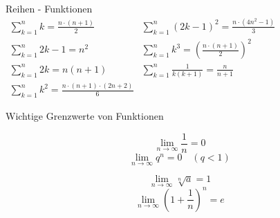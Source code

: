 \begin{corollary}{Reihen - Funktionen}\\
    $
    \begin{array}{ll}
        \sum^{n}_{k=1} k = \frac{n \cdot (n+1)}{2} & \sum^{n}_{k=1} (2k - 1)^2 = \frac{n \cdot (4n^2-1)}{3}\\
    	\sum^{n}_{k=1} 2k-1 = n^2 & \sum^{n}_{k=1} k^3 = \left( \frac{n \cdot (n+1)}{2}\right)^2\\
    	\sum^{n}_{k=1} 2k = n(n+1) & \sum^{n}_{k=1} \frac{1}{k(k+1)} = \frac{n}{n+1}\\
    	\sum^{n}_{k=1} k^2 = \frac{n \cdot (n+1) \cdot (2n+2)}{6} &
    \end{array}
    $
\end{corollary}



\begin{highlight}{Wichtige Grenzwerte von Funktionen}
    \begin{center}
        \begin{minipage}{0.4\linewidth}
                $$\lim _{n \rightarrow \infty} \frac{1}{n}=0$$
                $$\lim _{n \rightarrow \infty} q^n=0 \quad(q<1)$$
        \end{minipage}
        \hfill\vline\hfill
        \begin{minipage}{0.5\linewidth}
            $$\lim _{n \rightarrow \infty} \sqrt[n]{a}=1$$
            $$\lim _{n \rightarrow \infty}\left(1+\frac{1}{n}\right)^n=e$$
        \end{minipage}
    \end{center}
\end{highlight}



